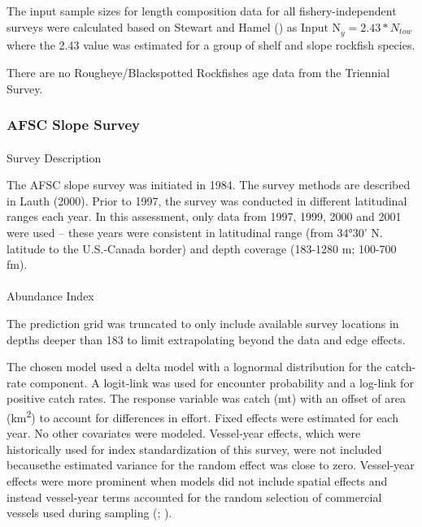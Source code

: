 \documentclass[
]{scrartcl}
\makeatletter
\let\oldparagraph\paragraph
\renewcommand{\paragraph}{
    \@ifstar
      \xxxParagraphStar
      \xxxParagraphNoStar
  }
\newcommand{\xxxParagraphStar}[1]{\oldparagraph*{#1}\mbox{}}
\newcommand{\xxxParagraphNoStar}[1]{\oldparagraph{#1}\mbox{}}
\makeatother
\begin{document}
The input sample sizes for length composition data for all
fishery-independent surveys were calculated based on Stewart and Hamel
() as
\(\text{Input N}_{y} = 2.43*N_{tow}\) where the 2.43 value was estimated
for a group of shelf and slope rockfish species.

There are no Rougheye/Blackspotted Rockfishes age data from the
Triennial Survey.

\subsubsection{AFSC Slope Survey}\label{afsc-slope-survey}

\paragraph{Survey Description}\label{survey-description-2}

The AFSC slope survey was initiated in 1984. The survey methods are
described in Lauth (2000). Prior to 1997, the survey was conducted in
different latitudinal ranges each year. In this assessment, only data
from 1997, 1999, 2000 and 2001 were used -- these years were consistent
in latitudinal range (from 34°30' N. latitude to the U.S.-Canada border)
and depth coverage (183-1280 m; 100-700 fm).

\paragraph{Abundance Index}\label{abundance-index-2}

The prediction grid was truncated to only include available survey
locations in depths deeper than 183 to limit extrapolating beyond the
data and edge effects.

The chosen model used a delta model with a lognormal distribution for
the catch-rate component. A logit-link was used for encounter
probability and a log-link for positive catch rates. The response
variable was catch (mt) with an offset of area (km\textsuperscript{2})
to account for differences in effort. Fixed effects were estimated for
each year. No other covariates were modeled. Vessel-year effects, which
were historically used for index standardization of this survey, were
not included becausethe estimated variance for the random effect was
close to zero. Vessel-year effects were more prominent when models did
not include spatial effects and instead vessel-year terms accounted for
the random selection of commercial vessels used during sampling
(;
).
\end{document}
